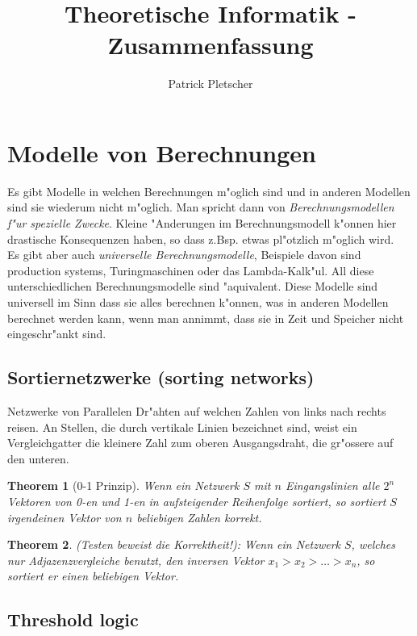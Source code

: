 \documentclass[german, 10pt, a4paper, twocolumn]{scrartcl}
\title{Theoretische Informatik - Zusammenfassung}
\author{Patrick Pletscher}
\newtheorem{theorem}{Theorem}[section]
\theoremstyle{definition}
\theoremstyle{example}
\begin{document}
\maketitle

\section{Modelle von Berechnungen}

Es gibt Modelle in welchen Berechnungen m"oglich sind und in anderen Modellen sind sie wiederum nicht m"oglich. Man spricht dann von \textit{Berechnungsmodellen f"ur spezielle Zwecke}. Kleine "Anderungen im Berechnungsmodell k"onnen hier drastische Konsequenzen haben, so dass z.Bsp. etwas pl"otzlich m"oglich wird.\\
Es gibt aber auch \textit{universelle Berechnungsmodelle}, Beispiele davon sind production systems, Turingmaschinen oder das Lambda-Kalk"ul. All diese unterschiedlichen Berechnungsmodelle sind "aquivalent. Diese Modelle sind universell im Sinn dass sie alles berechnen k"onnen, was in anderen Modellen berechnet werden kann, wenn man annimmt, dass sie in Zeit und Speicher nicht eingeschr"ankt sind.

\subsection{Sortiernetzwerke (sorting networks)}

Netzwerke von Parallelen Dr"ahten auf welchen Zahlen von links nach rechts reisen. An Stellen, die durch vertikale Linien bezeichnet sind, weist ein Vergleichgatter die kleinere Zahl zum oberen Ausgangsdraht, die gr"ossere auf den unteren. 

\begin{theorem}[0-1 Prinzip]
	Wenn ein Netzwerk $S$ mit $n$ Eingangslinien alle $2^n$ Vektoren von 0-en und 1-en in aufsteigender Reihenfolge sortiert, so sortiert $S$ irgendeinen Vektor von $n$ beliebigen Zahlen korrekt.
\end{theorem}

\begin{theorem}
	(Testen beweist die Korrektheit!): Wenn ein Netzwerk $S$, welches nur Adjazenzvergleiche benutzt, den inversen Vektor $x_1 > x_2 > \ldots > x_n$, so sortiert er einen beliebigen Vektor.
\end{theorem}

\subsection{Threshold logic}
\end{document}
